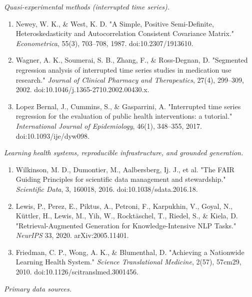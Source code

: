\documentclass[
  11pt,
]{article}
\providecommand{\tightlist}{%
  \setlength{\itemsep}{0pt}\setlength{\parskip}{0pt}}
\begin{document}
\emph{Quasi-experimental methods (interrupted time series).}

\begin{enumerate}
\def\labelenumi{\arabic{enumi}.}
\setcounter{enumi}{5}
\tightlist
\item
  Newey, W. K., \& West, K. D. "A Simple, Positive Semi-Definite,
  Heteroskedasticity and Autocorrelation Consistent Covariance Matrix."
  \emph{Econometrica}, 55(3), 703--708, 1987. doi:10.2307/1913610.
\item
  Wagner, A. K., Soumerai, S. B., Zhang, F., \& Ross-Degnan, D.
  "Segmented regression analysis of interrupted time series studies in
  medication use research." \emph{Journal of Clinical Pharmacy and
  Therapeutics}, 27(4), 299--309, 2002.
  doi:10.1046/j.1365-2710.2002.00430.x.
\item
  Lopez Bernal, J., Cummins, S., \& Gasparrini, A. "Interrupted time
  series regression for the evaluation of public health interventions: a
  tutorial." \emph{International Journal of Epidemiology}, 46(1),
  348--355, 2017. doi:10.1093/ije/dyw098.
\end{enumerate}

\emph{Learning health systems, reproducible infrastructure, and grounded
generation.}

\begin{enumerate}
\def\labelenumi{\arabic{enumi}.}
\setcounter{enumi}{8}
\tightlist
\item
  Wilkinson, M. D., Dumontier, M., Aalbersberg, Ij. J., et al. "The FAIR
  Guiding Principles for scientific data management and stewardship."
  \emph{Scientific Data}, 3, 160018, 2016. doi:10.1038/sdata.2016.18.
\item
  Lewis, P., Perez, E., Piktus, A., Petroni, F., Karpukhin, V., Goyal,
  N., Küttler, H., Lewis, M., Yih, W., Rocktäschel, T., Riedel, S., \&
  Kiela, D. "Retrieval-Augmented Generation for Knowledge-Intensive NLP
  Tasks." \emph{NeurIPS} 33, 2020. arXiv:2005.11401.
\item
  Friedman, C. P., Wong, A. K., \& Blumenthal, D. "Achieving a
  Nationwide Learning Health System." \emph{Science Translational
  Medicine}, 2(57), 57cm29, 2010. doi:10.1126/scitranslmed.3001456.
\end{enumerate}

\emph{Primary data sources.}
\end{document}
